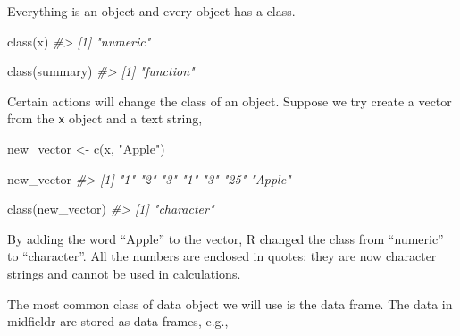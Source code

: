 \documentclass[
]{book}
\newenvironment{Shaded}{\begin{snugshade}}{\end{snugshade}}
\newcommand{\CommentTok}[1]{\textcolor[rgb]{0.56,0.35,0.01}{\textit{#1}}}
\newcommand{\FunctionTok}[1]{\textcolor[rgb]{0.00,0.00,0.00}{#1}}
\newcommand{\NormalTok}[1]{#1}
\newcommand{\OtherTok}[1]{\textcolor[rgb]{0.56,0.35,0.01}{#1}}
\newcommand{\StringTok}[1]{\textcolor[rgb]{0.31,0.60,0.02}{#1}}
\begin{document}
Everything is an object and every object has a class.

\begin{Shaded}
\begin{Highlighting}[]
\FunctionTok{class}\NormalTok{(x)}
\CommentTok{\#\textgreater{} [1] "numeric"}

\FunctionTok{class}\NormalTok{(summary)}
\CommentTok{\#\textgreater{} [1] "function"}
\end{Highlighting}
\end{Shaded}

Certain actions will change the class of an object. Suppose we try create a vector from the \texttt{x} object and a text string,

\begin{Shaded}
\begin{Highlighting}[]
\NormalTok{new\_vector }\OtherTok{\textless{}{-}} \FunctionTok{c}\NormalTok{(x, }\StringTok{"Apple"}\NormalTok{)}

\NormalTok{new\_vector}
\CommentTok{\#\textgreater{} [1] "1"     "2"     "3"     "1"     "3"     "25"    "Apple"}

\FunctionTok{class}\NormalTok{(new\_vector)}
\CommentTok{\#\textgreater{} [1] "character"}
\end{Highlighting}
\end{Shaded}

By adding the word ``Apple'' to the vector, R changed the class from ``numeric'' to ``character''. All the numbers are enclosed in quotes: they are now character strings and cannot be used in calculations.

The most common class of data object we will use is the data frame. The data in midfieldr are stored as data frames, e.g.,
\end{document}
